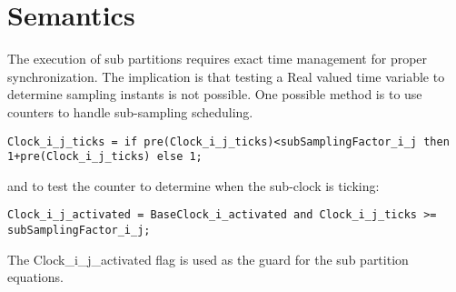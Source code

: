 \section{Semantics}\label{semantics}

The execution of sub partitions requires exact time management for
proper synchronization. The implication is that testing a Real valued
time variable to determine sampling instants is not possible. One
possible method is to use counters to handle sub-sampling scheduling.

\begin{lstlisting}[language=modelica]
Clock_i_j_ticks = if pre(Clock_i_j_ticks)<subSamplingFactor_i_j then 1+pre(Clock_i_j_ticks) else 1;
\end{lstlisting}

and to test the counter to determine when the sub-clock is ticking:
\begin{lstlisting}[language=modelica]
Clock_i_j_activated = BaseClock_i_activated and Clock_i_j_ticks >= subSamplingFactor_i_j;
\end{lstlisting}
The Clock\_i\_j\_activated flag is used as the guard for the sub
partition equations.

